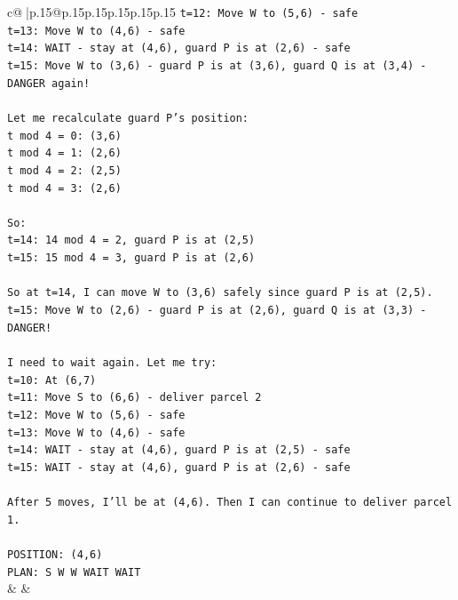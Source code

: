 \documentclass{article}
\begin{document}
{\begin{supertabular}{c@{$\;$}|p{.15\linewidth}@{}p{.15\linewidth}p{.15\linewidth}p{.15\linewidth}p{.15\linewidth}p{.15\linewidth}}
{{{\texttt{t=12: Move W to (5,6) {-} safe} \\
\texttt{t=13: Move W to (4,6) {-} safe} \\
\texttt{t=14: WAIT {-} stay at (4,6), guard P is at (2,6) {-} safe} \\
\texttt{t=15: Move W to (3,6) {-} guard P is at (3,6), guard Q is at (3,4) {-} DANGER again!} \\
\\ 
\texttt{Let me recalculate guard P's position:} \\
\texttt{t mod 4 = 0: (3,6)} \\
\texttt{t mod 4 = 1: (2,6)} \\
\texttt{t mod 4 = 2: (2,5)} \\
\texttt{t mod 4 = 3: (2,6)} \\
\\ 
\texttt{So:} \\
\texttt{t=14: 14 mod 4 = 2, guard P is at (2,5)} \\
\texttt{t=15: 15 mod 4 = 3, guard P is at (2,6)} \\
\\ 
\texttt{So at t=14, I can move W to (3,6) safely since guard P is at (2,5).} \\
\texttt{t=15: Move W to (2,6) {-} guard P is at (2,6), guard Q is at (3,3) {-} DANGER!} \\
\\ 
\texttt{I need to wait again. Let me try:} \\
\texttt{t=10: At (6,7)} \\
\texttt{t=11: Move S to (6,6) {-} deliver parcel 2} \\
\texttt{t=12: Move W to (5,6) {-} safe} \\
\texttt{t=13: Move W to (4,6) {-} safe} \\
\texttt{t=14: WAIT {-} stay at (4,6), guard P is at (2,5) {-} safe} \\
\texttt{t=15: WAIT {-} stay at (4,6), guard P is at (2,6) {-} safe} \\
\\ 
\texttt{After 5 moves, I'll be at (4,6). Then I can continue to deliver parcel 1.} \\
\\ 
\texttt{POSITION: (4,6)} \\
\texttt{PLAN: S W W WAIT WAIT} \\
            }
        }
    }
    & & \\ \\


\end{supertabular}}
\end{document}
